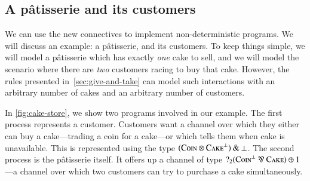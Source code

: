 \documentclass[10pt,a4paper,twocolumn,notitlepage]{article}
\begin{document}
\subsection{A p\^{a}tisserie and its customers}
We can use the new connectives to implement non-deterministic programs.
We will discuss an example: a p\^{a}tisserie, and its customers.
To keep things simple, we will model a p\^{a}tisserie which has exactly
\emph{one} cake to sell, and we will model the scenario where there are
\emph{two} customers racing to buy that cake.
However, the rules presented in~\autoref{sec:give-and-take} can model such
interactions with an arbitrary number of cakes and an arbitrary number of
customers.

In \autoref{fig:cake-store}, we show two programs involved in our example.
The first process represents a customer. Customers want a channel over which
they either can buy a cake---trading a coin for a cake---or which tells them
when cake is unavailable. This is represented using the type
$(\textsc{Coin}\otimes\textsc{Cake}^\bot)\mathbin{\text{\&}}\bot$.
The second process is the p\^{a}tisserie itself. It offers up a channel of type
$\give[2]{(\coin^\bot\parr\cake)\plus{1}}$---a channel over which two customers
can try to purchase a cake simultaneously.
\end{document}
